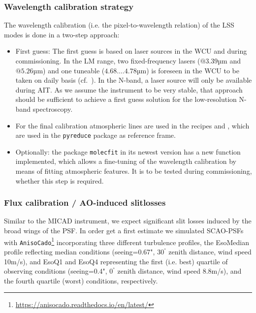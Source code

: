 \subsubsection{Wavelength calibration strategy}\label{ssec:wavecal}
The wavelength calibration (i.e. the pixel-to-wavelength relation) of the \ac{LSS} modes is done in a two-step approach:
\begin{itemize}
    \item First guess: The first guess is based on laser sources in the \ac{WCU} and during commissioning.  In the LM range, two fixed-frequency lasers ($@3.39$µm and $@5.26$µm) and one tuneable ($4.68....4.78$µm) is foreseen in the \ac{WCU} to be taken on daily basis (cf.~\cite{METIS-calibration_plan}). In the N-band, a laser source will only be available during \ac{AIT}. As we assume the instrument to be very stable, that approach should be sufficient to achieve a first guess solution for the low-resolution N-band spectroscopy.
    \item For the final calibration atmospheric lines are used in the recipes  and , which are used in the \texttt{pyreduce} package as reference frame.
    \item Optionally: the package \texttt{molecfit} in its newest version has a new function implemented, which allows a fine-tuning of the wavelength calibration by means of fitting atmospheric features. It is to be tested during commissioning, whether this step is required.
\end{itemize}

\subsubsection{Flux calibration / AO-induced slitlosses}\label{ssec:aoslitloss}
Similar to the MICAD instrument, we expect significant slit losses induced by the broad wings of the \ac{PSF}. In order get a first estimate we simulated \ac{SCAO}-PSFs with \texttt{AnisoCado}\footnote{\url{https://anisocado.readthedocs.io/en/latest/}} incorporating three different turbulence profiles, the EsoMedian profile reflecting median conditions (seeing=0.67", 30$^°$ zenith distance, wind speed 10m/s), and EsoQ1 and EsoQ4 representing the first (i.e. best) quartile of observing conditions (seeing=0.4", 0$^°$ zenith distance, wind speed 8.8m/s), and the fourth quartile (worst) conditions, respectively.

